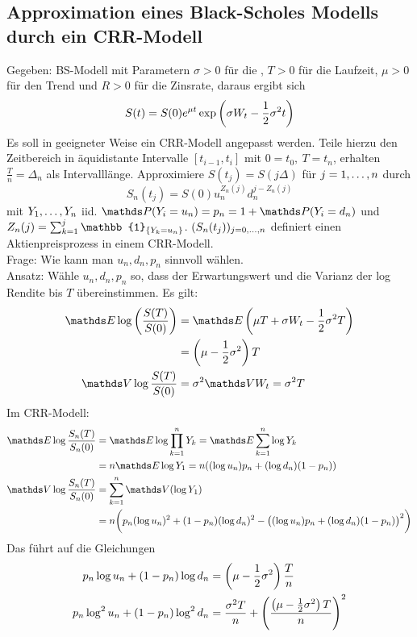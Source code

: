 \subsection{Approximation eines Black-Scholes Modells durch ein CRR-Modell}
\label{sub:appox_bs-modell}
Gegeben: BS-Modell mit Parametern $\sigma>0$ für die , $T>0$ für die Laufzeit, $\mu>0$ für den Trend und $R>0$ für die Zinsrate, daraus ergibt sich
\[
S(t)=S(0)e^{\mu t}\exp\left( \sigma W_t-\frac{1}{2}\sigma^2t\right)
\]
Es soll in geeigneter Weise ein CRR-Modell angepasst werden.
Teile hierzu den Zeitbereich in äquidistante Intervalle $[t_{i-1},t_i]$ mit $0=t_0,~T=t_n$, erhalten $\frac{T}{n}=\Delta_n$ als Intervalllänge.
Approximiere $S(t_j)=S(j\Delta)$ für $j=1, \dots ,n$ durch
\[
S_n(t_j)=S(0)u_n^{Z_n(j)}d_n^{j-Z_n(j)}
\]
mit $Y_1, \dots ,Y_n$ iid. $\Pw(Y_i=u_n)=p_n=1+\Pw(Y_i=d_n)$ und $Z_n(j)=\sum_{k=1}^{j}\mathbb{1}_{\penbrace{Y_k=u_n}}$.
$(S_n(t_j))_{j=0, \dots ,n}$ definiert einen Aktienpreisprozess in einem CRR-Modell.\\
Frage: Wie kann man $u_n,d_n,p_n$ sinnvoll wählen.\\
Ansatz: Wähle $u_n,d_n,p_n$ so, dass der Erwartungswert und die Varianz der log Rendite bis $T$ übereinstimmen.
Es gilt:
\begin{equation*}
\begin{aligned}
	\E\log\enbrace{\frac{S(T)}{S(0)}}&=\E\enbrace{\mu T+\sigma W_t-\frac{1}{2}\sigma^2T}\\
	&=\enbrace{\mu-\frac{1}{2}\sigma^2}T\\
	\V \log\frac{S(T)}{S(0)}&=\sigma^2\V W_t=\sigma^2T
\end{aligned}
\end{equation*}
Im CRR-Modell:
\begin{equation*}
\begin{aligned}
	\E \log\frac{S_n(T)}{S_n(0)}&=\E\log\prod_{k=1}^{n}Y_k = \E\sum_{k=1}^{n}\log Y_k\\
	&=n\E\log Y_1 = n((\log u_n)p_n+(\log d_n)(1-p_n))\\
	\V \log\frac{S_n(T)}{S_n(0)}&= \sum_{k=1}^{n}\V(\log Y_1)\\
	&=n\bigg(p_n(\log u_n)^2+(1-p_n)(\log d_n)^2-\big((\log u_n)p_n+(\log d_n)(1-p_n)\big)^2 \bigg)
\end{aligned}
\end{equation*}
Das führt auf die Gleichungen
\begin{equation*}
\begin{aligned}
	p_n\log u_n + (1-p_n)\log d_n &= \left( \mu-\frac{1}{2}\sigma^2\right)\frac{T}{n}\\
	p_n\log^2 u_n + (1-p_n)\log^2 d_n &= \frac{\sigma^2T}{n}+\left( \frac{\left( \mu-\frac{1}{2}\sigma^2\right)T}{n}\right)^2
\end{aligned}
\end{equation*}
